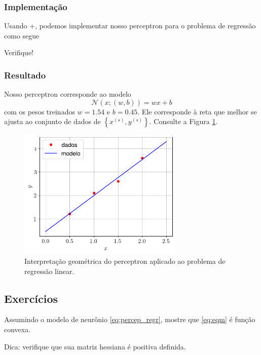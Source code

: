 \subsubsection{Implementação}

\ifispython
Usando {\python}+{\pytorch}, podemos implementar nosso perceptron para o problema de regressão como segue



Verifique!
\fi

\subsubsection{Resultado}

Nosso perceptron corresponde ao modelo
\begin{equation}
  \mathcal{N}(x; (w,b)) = wx + b
\end{equation}
com os pesos treinados $w = 1.54$ e $b = 0.45$. Ele corresponde à reta que melhor se ajusta ao conjunto de dados de $\left\{x^{(s)}, y^{(s)}\right\}$. Consulte a Figura \ref{fig:percep_mq}.

\begin{figure}[H]
  \centering
  \includegraphics[width=0.7\textwidth]{./cap_perceptron/dados/fig_percep_mq/main}
  \caption{Interpretação geométrica do perceptron aplicado ao problema de regressão linear.}
  \label{fig:percep_mq}
\end{figure}

\subsection{Exercícios}

\begin{exer}\label{exer:eqm_convexa}
  Assumindo o modelo de neurônio \eqref{eq:percep_regr}, mostre que \eqref{eq:eqm} é função convexa.
\end{exer}
\begin{resp}
  Dica: verifique que sua matriz hessiana é positiva definida.
\end{resp}

